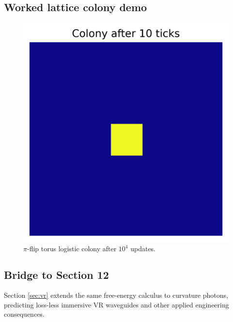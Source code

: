 \subsection{Worked lattice colony demo}

\begin{figure}[t]
  \centering
  \includegraphics[width=\linewidth]{figs/lattice_colony.png}
  \caption{$\pi$-flip torus logistic colony after $10^4$ updates.}
  \label{fig:colony}
\end{figure}

\subsection{Bridge to Section 12}

Section \ref{sec:vr} extends the same free-energy calculus to curvature
photons, predicting loss-less immersive VR waveguides and other applied
engineering consequences.

\clearpage
